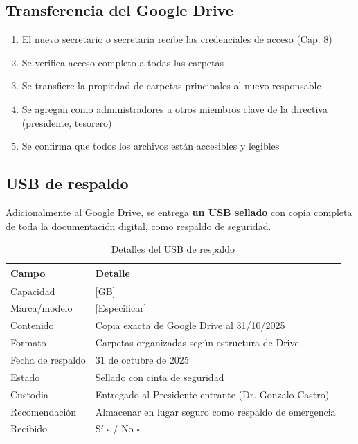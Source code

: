 \subsection*{Transferencia del Google Drive}

\begin{enumerate}
  \item El nuevo secretario o secretaria recibe las credenciales de acceso (Cap. 8)
  \item Se verifica acceso completo a todas las carpetas
  \item Se transfiere la propiedad de carpetas principales al nuevo responsable
  \item Se agregan como administradores a otros miembros clave de la directiva (presidente, tesorero)
  \item Se confirma que todos los archivos están accesibles y legibles
\end{enumerate}

\subsection*{USB de respaldo}

Adicionalmente al Google Drive, se entrega \textbf{un USB sellado} con copia completa de toda la documentación digital, como respaldo de seguridad.

\begin{table}[H]
\centering
\caption{Detalles del USB de respaldo}
\label{tab:usb-respaldo}
\begin{tabularx}{\textwidth}{@{}lX@{}}
\toprule
\textbf{Campo} & \textbf{Detalle} \\
\midrule
Capacidad & [GB] \\
Marca/modelo & [Especificar] \\
Contenido & Copia exacta de Google Drive al 31/10/2025 \\
Formato & Carpetas organizadas según estructura de Drive \\
Fecha de respaldo & 31 de octubre de 2025 \\
Estado & Sellado con cinta de seguridad \\
Custodia & Entregado al Presidente entrante (Dr. Gonzalo Castro) \\
Recomendación & Almacenar en lugar seguro como respaldo de emergencia \\
Recibido & Sí $\square$ / No $\square$ \\
\bottomrule
\end{tabularx}
\end{table}

